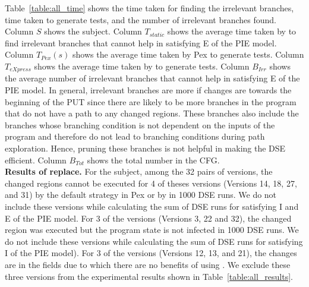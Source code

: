 Table~\ref{table:all_time} shows the time taken for finding the irrelevant branches, time taken to generate tests, and the number of irrelevant branches found. Column $S$ shows the subject. Column $T_{static}$ shows the average time taken by  to find irrelevant branches that cannot help in satisfying E of the PIE model. Column $T_{Pex}(s)$ shows the average time taken by Pex to generate tests. Column $T_{eXpress}$ shows the average time taken by  to generate tests. Column $B_{Irr}$ shows the average number of irrelevant branches that cannot help in satisfying E of the PIE model. In general, irrelevant branches are more if changes are towards the beginning of the PUT since there are likely to be more branches in the program that do not have a path to any changed regions. These branches also include the branches whose branching condition is not dependent on the inputs of the program and therefore do not lead to branching conditions during path exploration. Hence, pruning these branches is not helpful in making the DSE efficient. Column $B_{Tot}$ shows the total number in the CFG.
\\ \textbf{Results of replace. }For the  subject, among the 32 pairs of versions, the changed regions cannot be executed for 4 of theses versions (Versions 14, 18, 27, and 31) by the default strategy in Pex or by  in 1000 DSE runs. We do not include these versions while calculating the sum of DSE runs for satisfying I and E of the PIE model. For 3 of the versions (Versions 3, 22 and 32), the changed region was executed but the program state is not infected in 1000 DSE runs. We do not include these versions while calculating the sum of DSE runs for satisfying I of the PIE model). For 3 of the versions (Versions 12, 13, and 21), the changes are in the fields due to which there are no benefits of using . We exclude these three versions from the experimental results shown in Table~\ref{table:all_results}. 

